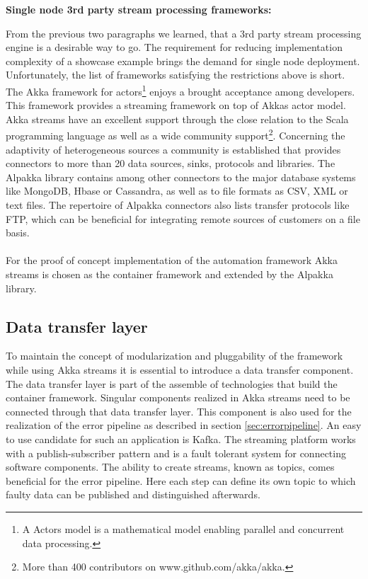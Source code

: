 \textbf{Single node 3rd party stream processing frameworks:}

\noindent From the previous two paragraphs we learned, that a 3rd party stream processing engine is a desirable way to go. The requirement for reducing implementation complexity of a showcase example brings the demand for single node deployment. Unfortunately, the list of frameworks satisfying the restrictions above is short. The Akka framework for actors\footnote{A Actors model is a mathematical model enabling parallel and concurrent data processing.} \cite{akka_2017} enjoys a brought acceptance among developers. This framework provides a streaming framework on top of Akkas actor model. Akka streams \cite{akka_streams_2017} have an excellent support through the close relation to the Scala programming language as well as a wide community support\footnote{More than 400 contributors on www.github.com/akka/akka.}. Concerning the adaptivity of heterogeneous sources a community is established that provides connectors to more than 20 data sources, sinks, protocols and libraries. The Alpakka library \cite{alpakka_2016} contains among other connectors to the major database systems like MongoDB, Hbase or Cassandra, as well as to file formats as CSV, XML or text files. The repertoire of Alpakka connectors also lists transfer protocols like FTP, which can be beneficial for integrating remote sources of customers on a file basis.
\\\\
For the proof of concept implementation of the automation framework Akka streams is chosen as the container framework and extended by the Alpakka library. 

\subsection{Data transfer layer}
To maintain the concept of modularization and pluggability of the framework while using Akka streams it is essential to introduce a data transfer component. The data transfer layer is part of the assemble of technologies that build the container framework. Singular components realized in Akka streams need to be connected through that data transfer layer. This component is also used for the realization of the error pipeline as described in section \ref{sec:errorpipeline}. An easy to use candidate for such an application is Kafka. The streaming platform works with a publish-subscriber pattern and is a fault tolerant system for connecting software components. The ability to create streams, known as topics, comes beneficial for the error pipeline. Here each step can define its own topic to which faulty data can be published and distinguished afterwards.

